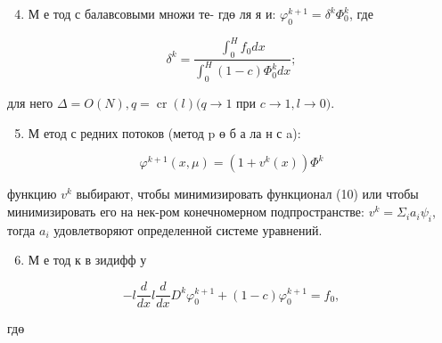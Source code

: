 \documentclass[10pt]{article}
\begin{document}
\begin{enumerate}

  \setcounter{enumi}{3}

  \item М е тод с балавсовыми множи те- гдө ля я и: $\varphi_{0}^{k+1}=\delta^{k} \Phi_{0}^{k}$, где

\end{enumerate}



\[

\delta^{k}=\frac{\int_{0}^{H} f_{0} d x}{\int_{0}^{H}(1-c) \Phi_{0}^{k} d x} ;

\]



для него $\Delta=O(N), q=\operatorname{cr}(l)(q \rightarrow 1$ при $c \rightarrow 1, l \rightarrow 0)$.



\begin{enumerate}

  \setcounter{enumi}{4}

  \item М етод с редних потоков (метод p ө б а ла н с a):

\end{enumerate}



\[

\varphi^{k+1}(x, \mu)=\left(1+v^{k}(x)\right) \Phi^{k}

\]



функцию $v^{k}$ выбирают, чтобы минимизировать функционал (10) или чтобы минимизировать его на нек-ром конечномерном подпространстве: $v^{k}=\Sigma_{i} a_{i} \psi_{i}$, тогда $a_{i}$ удовлетворяют определенной системе уравнений.



\begin{enumerate}

  \setcounter{enumi}{5}

  \item М е тод к в зидифф у

\end{enumerate}



\[

-l \frac{d}{d x} l \frac{d}{d x} D^{k} \varphi_{0}^{k+1}+(1-c) \varphi_{0}^{k+1}=f_{0},

\]



гдө
\end{document}
